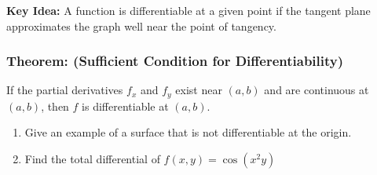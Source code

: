 \textbf{Key Idea:} A function is differentiable at a given point if the tangent plane approximates the graph well near the point of tangency.


\vspace*{.2in}

\subsubsection{Theorem: (Sufficient Condition for Differentiability)}
If the partial derivatives \(f_x\) and \(f_y\) exist near \((a,b)\) and are continuous at \((a,b)\), then \(f\) is differentiable at \((a,b)\).







\begin{enumerate}[{Example} 1: ]
\addtocounter{enumi}{1}
\item Give an example of a surface that is not differentiable at the origin.
\vfill

\item Find the total differential of \(f(x,y) = \cos(x^2 y)\)
\vfill

\end{enumerate}


\pagebreak

